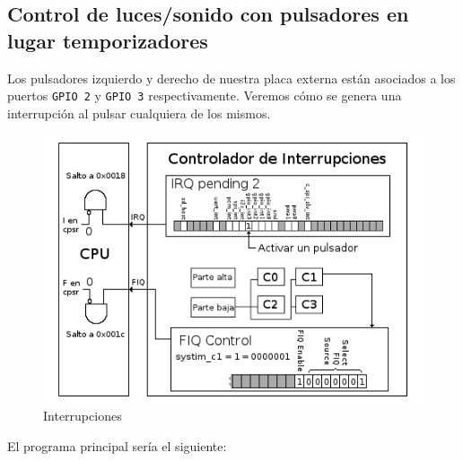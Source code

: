 \subsection{Control de luces/sonido con pulsadores en lugar temporizadores}

Los pulsadores izquierdo y derecho de nuestra placa externa están asociados a los
puertos {\tt GPIO 2} y {\tt GPIO 3} respectivamente. Veremos
cómo se genera una interrupción al pulsar cualquiera de los mismos.

\begin{figure}[h]
  \centering
    \includegraphics[width=14cm]{graphs/inter6.png}
  \caption{Interrupciones}
  \label{fig:inter6}
\end{figure}

El programa principal sería el siguiente:

